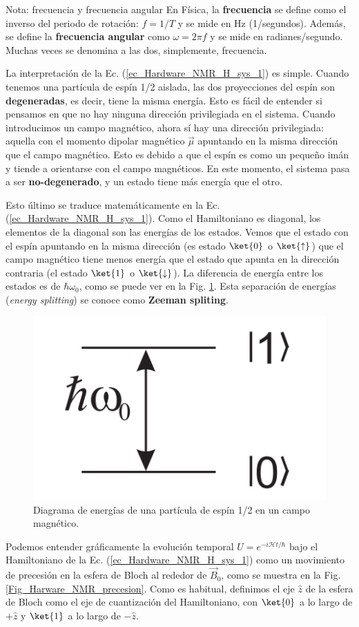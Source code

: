 \begin{mybox_blue}{Nota: frecuencia y frecuencia angular}
En Física, la \textbf{frecuencia} se define como el inverso del periodo de rotación: $f = 1/T$ y se mide en Hz (1/segundos). Además, se define la \textbf{frecuencia angular} como $\omega = 2\pi f$ y se mide en radianes/segundo. Muchas veces se denomina a las dos, simplemente, frecuencia.
\end{mybox_blue}

La interpretación de la Ec. (\ref{ec_Hardware_NMR_H_sys_1}) es simple. Cuando tenemos una partícula de espín 1/2 aislada, las dos proyecciones del espín son \textbf{degeneradas}, es decir, tiene la misma energía. Esto es fácil de entender si pensamos en que no hay ninguna dirección privilegiada en el sistema. Cuando introducimos un campo magnético, ahora sí hay una dirección privilegiada: aquella con el momento dipolar magnético $\vec{\mu}$ apuntando en la misma dirección que el campo magnético. Esto es debido a que el espín es como un pequeño imán y tiende a orientarse con el campo magnéticos. En este momento, el sistema pasa a ser \textbf{no-degenerado}, y un estado tiene más energía que el otro.

Esto último se traduce matemáticamente en la Ec. (\ref{ec_Hardware_NMR_H_sys_1}). Como el Hamiltoniano es diagonal, los elementos de la diagonal son las energías de los estados. Vemos que el estado con el espín apuntando en la misma dirección (es estado $\ket{0}$ o $\ket{\uparrow}$) que el campo magnético tiene menos energía que el estado que apunta en la dirección contraria (el estado $\ket{1}$ o $\ket{\downarrow}$). La diferencia de energía entre los estados es de $\hbar \omega_0$, como se puede ver en la Fig. \ref{Fig_Harware_NMR_split_Zeeman}. Esta separación de energías (\textit{energy splitting}) se conoce como \textbf{Zeeman spliting}.

	\begin{figure}[H]
	\centering 
	\includegraphics[width=0.15\linewidth]{Figuras/Fig_Harware_NMR_split_Zeeman.png}
	\caption{Diagrama de energías de una partícula de espín 1/2 en un campo magnético.}
	\label{Fig_Harware_NMR_split_Zeeman}
	\end{figure}


Podemos entender gráficamente la evolución temporal $U = e^{-i \mathcal{H} t/ \hbar}$ bajo el Hamiltoniano de la Ec. (\ref{ec_Hardware_NMR_H_sys_1}) como un movimiento de precesión en la esfera de Bloch al rededor de $\vec{B}_0$, como se muestra en la Fig. \ref{Fig_Harware_NMR_precesion}. Como es habitual, definimos el eje $\hat{z}$ de la esfera de Bloch como el eje de cuantización del Hamiltoniano, con $\ket{0}$ a lo largo de $+\hat{z}$ y $\ket{1}$ a lo largo de $-\hat{z}$.

